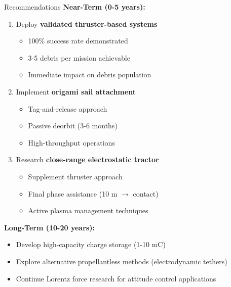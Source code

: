 \documentclass[aspectratio=169]{beamer}
\begin{document}
\begin{frame}{Recommendations}
\textbf{Near-Term (0-5 years):}
\begin{enumerate}
    \item Deploy \textbf{validated thruster-based systems}
    \begin{itemize}
        \item 100\% success rate demonstrated
        \item 3-5 debris per mission achievable
        \item Immediate impact on debris population
    \end{itemize}

    \item Implement \textbf{origami sail attachment}
    \begin{itemize}
        \item Tag-and-release approach
        \item Passive deorbit (3-6 months)
        \item High-throughput operations
    \end{itemize}

    \item Research \textbf{close-range electrostatic tractor}
    \begin{itemize}
        \item Supplement thruster approach
        \item Final phase assistance (10 m $\rightarrow$ contact)
        \item Active plasma management techniques
    \end{itemize}
\end{enumerate}

\vspace{0.3cm}
\textbf{Long-Term (10-20 years):}
\begin{itemize}
    \item Develop high-capacity charge storage (1-10 mC)
    \item Explore alternative propellantless methods (electrodynamic tethers)
    \item Continue Lorentz force research for attitude control applications
\end{itemize}
\end{frame}
\end{document}
